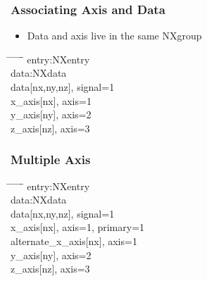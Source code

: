 \documentclass{beamer}
\begin{document}
\begin{frame} \frametitle{Associating Axis and Data}
\begin{itemize}
\item Data and axis live in the same NXgroup
\end{itemize}
\begin{tabbing}
\hspace*{1cm} \= \hspace*{1cm} \= \hspace*{1cm} \= \hspace*{1cm} \= \hspace*{1cm} \= \hspace*{1cm}\= \kill
entry:NXentry \\
 \>data:NXdata\\
 \> \> data[nx,ny,nz], signal=1\\
 \> \> x\_axis[nx], axis=1\\
 \> \> y\_axis[ny], axis=2\\
 \> \> z\_axis[nz], axis=3\\
\end{tabbing}
\end{frame}

\begin{frame} \frametitle{Multiple Axis}
\begin{tabbing}
\hspace*{1cm} \= \hspace*{1cm} \= \hspace*{1cm} \= \hspace*{1cm} \= \hspace*{1cm} \= \hspace*{1cm}\= \kill
entry:NXentry \\
 \>data:NXdata\\
 \> \> data[nx,ny,nz], signal=1\\
 \> \> x\_axis[nx], axis=1, primary=1\\
 \> \> alternate\_x\_axis[nx], axis=1\\
 \> \> y\_axis[ny], axis=2\\
 \> \> z\_axis[nz], axis=3\\
\end{tabbing}
\end{frame}
\end{document}
